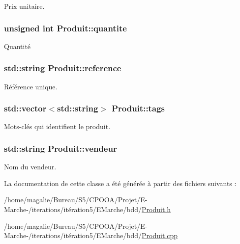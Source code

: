 Prix unitaire. 

\hypertarget{class_produit_a6c569e4c47aed9ee050bb0aa9455dd62}{
\subsubsection[{quantite}]{\setlength{\rightskip}{0pt plus 5cm}unsigned int Produit\-::quantite\hspace{0.3cm}{\ttfamily [protected]}}}\label{class_produit_a6c569e4c47aed9ee050bb0aa9455dd62}


Quantité 

\hypertarget{class_produit_a373d0a18812023e675ae981ca9618209}{
\subsubsection[{reference}]{\setlength{\rightskip}{0pt plus 5cm}std\-::string Produit\-::reference\hspace{0.3cm}{\ttfamily [protected]}}}\label{class_produit_a373d0a18812023e675ae981ca9618209}


Référence unique. 

\hypertarget{class_produit_a0fe989b845422996d650da8e5cc09fcf}{
\subsubsection[{tags}]{\setlength{\rightskip}{0pt plus 5cm}std\-::vector$<$std\-::string$>$ Produit\-::tags\hspace{0.3cm}{\ttfamily [protected]}}}\label{class_produit_a0fe989b845422996d650da8e5cc09fcf}


Mots-\/clés qui identifient le produit. 

\hypertarget{class_produit_a176eb59190cd9b761814fd5c68a8353b}{
\subsubsection[{vendeur}]{\setlength{\rightskip}{0pt plus 5cm}std\-::string Produit\-::vendeur\hspace{0.3cm}{\ttfamily [protected]}}}\label{class_produit_a176eb59190cd9b761814fd5c68a8353b}


Nom du vendeur. 



La documentation de cette classe a été générée à partir des fichiers suivants \-:\begin{DoxyCompactItemize}
\item 
/home/magalie/\-Bureau/\-S5/\-C\-P\-O\-O\-A/\-Projet/\-E-\/\-Marche-\//iterations/itération5/\-E\-Marche/bdd/\hyperlink{_produit_8h}{Produit.\-h}\item 
/home/magalie/\-Bureau/\-S5/\-C\-P\-O\-O\-A/\-Projet/\-E-\/\-Marche-\//iterations/itération5/\-E\-Marche/bdd/\hyperlink{_produit_8cpp}{Produit.\-cpp}\end{DoxyCompactItemize}
